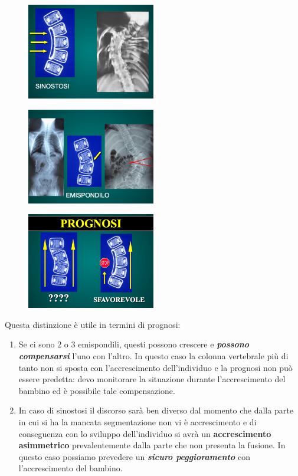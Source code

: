 \begin{figure}[!ht]
\centering
	\includegraphics[width=0.5\textwidth]{012/image8.png}
\end{figure}
\begin{figure}[!ht]
\centering
	\includegraphics[width=0.5\textwidth]{012/image9.png}
\end{figure}
\begin{figure}[!ht]
\centering
	\includegraphics[width=0.5\textwidth]{012/image10.png}
\end{figure}

Questa distinzione è utile in termini di prognosi:

\begin{enumerate}
\def\labelenumi{\arabic{enumi}.}
\item
  Se ci sono 2 o 3 emispondili, questi possono crescere e
  \textbf{\emph{possono compensarsi}} l'uno con l'altro. In questo caso
  la colonna vertebrale più di tanto non si sposta con l'accrescimento
  dell'individuo e la prognosi non può essere predetta: devo monitorare
  la situazione durante l'accrescimento del bambino ed è possibile tale
  compensazione.
\item
  In caso di sinostosi il discorso sarà ben diverso dal momento che
  dalla parte in cui si ha la mancata segmentazione non vi è
  accrescimento e di conseguenza con lo sviluppo dell'individuo si avrà
  un \textbf{accrescimento asimmetrico} prevalentemente dalla parte che
  non presenta la fusione. In questo caso possiamo prevedere un
  \textbf{\emph{sicuro peggioramento}} con l'accrescimento del bambino.
\end{enumerate}

